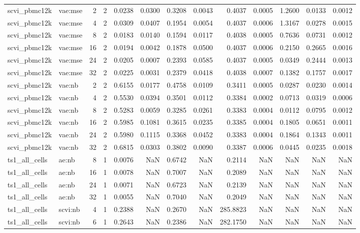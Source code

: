 \begin{tabular}{llrrrrrrrrrrr}
scvi\_pbmc12k & vae:mse & 2 & 2 & 0.0238 & 0.0300 & 0.3208 & 0.0043 & 0.4037 & 0.0005 & 1.2600 & 0.0133 & 0.0012 \\
scvi\_pbmc12k & vae:mse & 4 & 2 & 0.0309 & 0.0407 & 0.1954 & 0.0054 & 0.4037 & 0.0006 & 1.3167 & 0.0278 & 0.0015 \\
scvi\_pbmc12k & vae:mse & 8 & 2 & 0.0183 & 0.0140 & 0.1594 & 0.0117 & 0.4038 & 0.0005 & 0.7636 & 0.0731 & 0.0012 \\
scvi\_pbmc12k & vae:mse & 16 & 2 & 0.0194 & 0.0042 & 0.1878 & 0.0500 & 0.4037 & 0.0006 & 0.2150 & 0.2665 & 0.0016 \\
scvi\_pbmc12k & vae:mse & 24 & 2 & 0.0205 & 0.0007 & 0.2393 & 0.0585 & 0.4037 & 0.0005 & 0.0349 & 0.2444 & 0.0013 \\
scvi\_pbmc12k & vae:mse & 32 & 2 & 0.0225 & 0.0031 & 0.2379 & 0.0418 & 0.4038 & 0.0007 & 0.1382 & 0.1757 & 0.0017 \\
scvi\_pbmc12k & vae:nb & 2 & 2 & 0.6155 & 0.0177 & 0.4758 & 0.0109 & 0.3411 & 0.0005 & 0.0287 & 0.0230 & 0.0014 \\
scvi\_pbmc12k & vae:nb & 4 & 2 & 0.5530 & 0.0394 & 0.3501 & 0.0112 & 0.3384 & 0.0002 & 0.0713 & 0.0319 & 0.0006 \\
scvi\_pbmc12k & vae:nb & 8 & 2 & 0.5283 & 0.0059 & 0.3285 & 0.0261 & 0.3383 & 0.0004 & 0.0112 & 0.0795 & 0.0012 \\
scvi\_pbmc12k & vae:nb & 16 & 2 & 0.5985 & 0.1081 & 0.3615 & 0.0235 & 0.3385 & 0.0004 & 0.1805 & 0.0651 & 0.0011 \\
scvi\_pbmc12k & vae:nb & 24 & 2 & 0.5980 & 0.1115 & 0.3368 & 0.0452 & 0.3383 & 0.0004 & 0.1864 & 0.1343 & 0.0011 \\
scvi\_pbmc12k & vae:nb & 32 & 2 & 0.6815 & 0.0303 & 0.3802 & 0.0090 & 0.3387 & 0.0006 & 0.0445 & 0.0235 & 0.0018 \\
ts1\_all\_cells & ae:nb & 8 & 1 & 0.0076 & NaN & 0.6742 & NaN & 0.2114 & NaN & NaN & NaN & NaN \\
ts1\_all\_cells & ae:nb & 16 & 1 & 0.0078 & NaN & 0.7007 & NaN & 0.2089 & NaN & NaN & NaN & NaN \\
ts1\_all\_cells & ae:nb & 24 & 1 & 0.0071 & NaN & 0.6723 & NaN & 0.2139 & NaN & NaN & NaN & NaN \\
ts1\_all\_cells & ae:nb & 32 & 1 & 0.0055 & NaN & 0.7040 & NaN & 0.2049 & NaN & NaN & NaN & NaN \\
ts1\_all\_cells & scvi:nb & 4 & 1 & 0.2388 & NaN & 0.2670 & NaN & 285.8823 & NaN & NaN & NaN & NaN \\
ts1\_all\_cells & scvi:nb & 6 & 1 & 0.2643 & NaN & 0.2386 & NaN & 282.1750 & NaN & NaN & NaN & NaN \\

\end{tabular}
